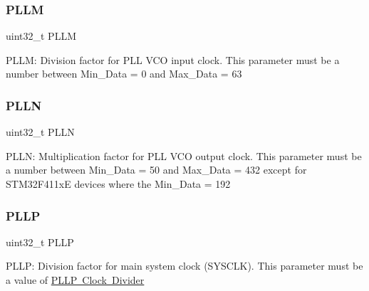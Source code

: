 \subsubsection{\texorpdfstring{P\+L\+LM}{PLLM}}
{\footnotesize\ttfamily uint32\+\_\+t P\+L\+LM}

P\+L\+LM\+: Division factor for P\+LL V\+CO input clock. This parameter must be a number between Min\+\_\+\+Data = 0 and Max\+\_\+\+Data = 63 \mbox{\label{struct_r_c_c___p_l_l_init_type_def_a2e8a73f7961f8d6570193c68daba88a6}} 
\subsubsection{\texorpdfstring{P\+L\+LN}{PLLN}}
{\footnotesize\ttfamily uint32\+\_\+t P\+L\+LN}

P\+L\+LN\+: Multiplication factor for P\+LL V\+CO output clock. This parameter must be a number between Min\+\_\+\+Data = 50 and Max\+\_\+\+Data = 432 except for S\+T\+M32\+F411xE devices where the Min\+\_\+\+Data = 192 \mbox{\label{struct_r_c_c___p_l_l_init_type_def_ae2047a6040de6fcd43e0033a7b09a226}} 
\subsubsection{\texorpdfstring{P\+L\+LP}{PLLP}}
{\footnotesize\ttfamily uint32\+\_\+t P\+L\+LP}

P\+L\+LP\+: Division factor for main system clock (S\+Y\+S\+C\+LK). This parameter must be a value of \mbox{\hyperlink{group___r_c_c___p_l_l_p___clock___divider}{P\+L\+LP Clock Divider}} \mbox{\label{struct_r_c_c___p_l_l_init_type_def_a4f9e0db99adb7afb9d2a87a2b4f433ab}} 

